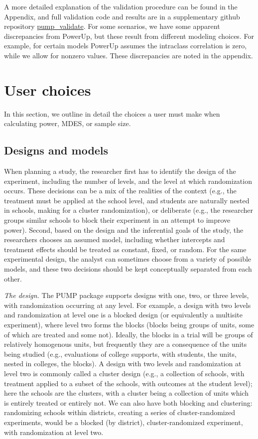 \documentclass[
]{article}
\begin{document}
A more detailed explanation of the validation procedure can be found in
the Appendix, and full validation code and results are in a
supplementary github repository
\href{https://github.com/MDRCNY/pump_validate}{pump\_validate}. For some
scenarios, we have some apparent discrepancies from PowerUp, but these
result from different modeling choices. For example, for certain models
PowerUp assumes the intraclass correlation is zero, while we allow for
nonzero values. These discrepancies are noted in the appendix.

\section{User choices}
\label{sec:choices}

In this section, we outline in detail the choices a user must make when
calculating power, MDES, or sample size.

\subsection{Designs and models}
\label{sec:d_m}

When planning a study, the researcher first has to identify the design
of the experiment, including the number of levels, and the level at
which randomization occurs. These decisions can be a mix of the
realities of the context (e.g., the treatment must be applied at the
school level, and students are naturally nested in schools, making for a
cluster randomization), or deliberate (e.g., the researcher groups
similar schools to block their experiment in an attempt to improve
power). Second, based on the design and the inferential goals of the
study, the researchers chooses an assumed model, including whether
intercepts and treatment effects should be treated as constant, fixed,
or random. For the same experimental design, the analyst can sometimes
choose from a variety of possible models, and these two decisions should
be kept conceptually separated from each other.

\emph{The design.} The PUMP package supports designs with one, two, or
three levels, with randomization occurring at any level. For example, a
design with two levels and randomization at level one is a blocked
design (or equivalently a multisite experiment), where level two forms
the blocks (blocks being groups of units, some of which are treated and
some not). Ideally, the blocks in a trial will be groups of relatively
homogenous units, but frequently they are a consequence of the units
being studied (e.g., evaluations of college supports, with students, the
units, nested in colleges, the blocks). A design with two levels and
randomization at level two is commonly called a cluster design (e.g., a
collection of schools, with treatment applied to a subset of the
schools, with outcomes at the student level); here the schools are the
clusters, with a cluster being a collection of units which is entirely
treated or entirely not. We can also have both blocking and clustering:
randomizing schools within districts, creating a series of
cluster-randomized experiments, would be a blocked (by district),
cluster-randomized experiment, with randomization at level two.
\end{document}
